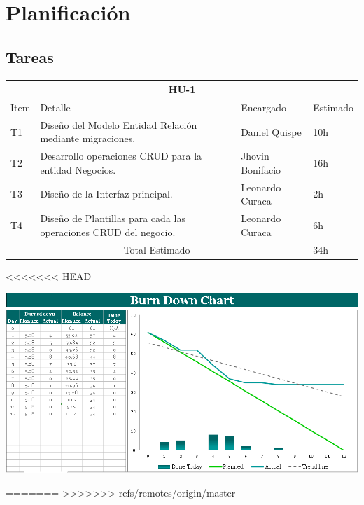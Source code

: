 \chapter{Planificación}
\section{Tareas}
\begin{table}[htbp]
	\begin{center}
		\begin{tabular}{| p{0.7cm} | p{10cm} | p{3.2cm} | p{1.8cm}|}
			\hline
			\multicolumn{4}{|c|}{HU-1}\\
			\hline
			Item & Detalle & Encargado & Estimado \\
			\hline
			T1 & Diseño del Modelo Entidad Relación mediante migraciones. & Daniel Quispe & 10h \\
			\hline
			T2 & Desarrollo operaciones CRUD para la entidad Negocios. & Jhovin Bonifacio & 16h \\
			\hline
			T3 & Diseño de la Interfaz principal. & Leonardo Curaca & 2h \\
			\hline
			T4 & Diseño de Plantillas para cada las operaciones CRUD del negocio. & Leonardo Curaca & 6h \\
			\hline
			\multicolumn{3}{|c|}{Total Estimado} & 34h\\
			\hline
		\end{tabular}
	\end{center}
\end{table}
<<<<<<< HEAD

\centering
	\includegraphics[width=1.20\textwidth]{img/BurnDownChart}\par\vspace{1cm}
	\vspace{0.30cm}	



=======
>>>>>>> refs/remotes/origin/master
